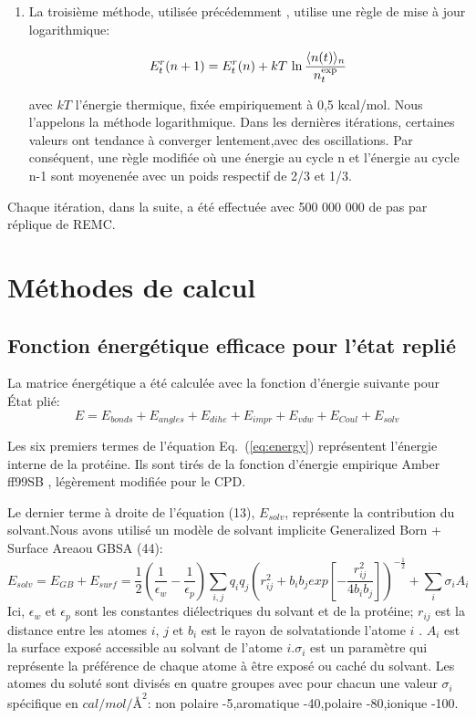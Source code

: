 \begin{enumerate}
\item La troisième méthode, utilisée précédemment \cite{Schmidt08,Simonson13b}, utilise une règle de mise à jour logarithmique:

  \begin{equation} \label{eq:log}
E^r_t (n+1) = E^r_t (n) + kT \, \ln \frac{\langle n(t) \rangle_n}{n_t^{\rm exp}}
\end{equation}

  avec $kT$ l'énergie thermique, fixée empiriquement à 0,5 kcal/mol. Nous l'appelons la méthode logarithmique. Dans les dernières itérations, certaines valeurs ont tendance à converger lentement,avec des oscillations. Par conséquent, une règle modifiée où une énergie au cycle n et l'énergie au cycle  n-1 sont moyenenée avec un poids respectif de 2/3 et 1/3.

\end{enumerate}
 
Chaque itération, dans la suite, a été effectuée avec 500 000 000 de pas par réplique de REMC.

\section{Méthodes de calcul}
  
\subsection{Fonction énergétique efficace pour l'état replié}

La matrice énergétique a été calculée avec la fonction d'énergie suivante pour
État plié:
\begin{equation}
  E = E_{bonds} + E_{angles} + E_{dihe} + E_{impr} + E_{vdw} + E_{Coul} + E_{solv}
  \label{eq:energy} 
\end{equation}

Les six premiers termes de l'équation Eq.\ (\ref{eq:energy})  représentent l'énergie interne de la protéine. Ils sont tirés de la fonction d'énergie empirique Amber ff99SB \cite{Cornell95}, légèrement modifiée pour le CPD.

Le dernier terme à droite de l'équation (13), $E_{solv}$, représente la contribution du solvant.Nous avons utilisé un modèle de solvant implicite \og Generalized Born + Surface Area\fg ou GBSA (44):
\begin{displaymath}
E_{solv} = E_{GB} + E_{surf} = \frac{1}{2}(\frac{1}{\epsilon_w} - \frac{1}{\epsilon_p})\sum_{i,j} q_iq_j (r^2_{ij} + b_ib_jexp[-\frac{r^2_{ij}}{4b_ib_j}])^{-\frac{1}{2}} + \sum_i \sigma_iA_i
\end{displaymath} 
Ici, $\epsilon_w$ et $\epsilon_p$ sont les constantes diélectriques du solvant et de la protéine; $r_{ij}$ est la distance entre les atomes $i$, $j$ et $b_i$ est le \og rayon de solvatation\fg de l'atome $i$ \cite{Hawkins95,Lopes07}. $A_i$ est la surface exposé accessible au solvant de l'atome $i$.$\sigma_i$ est un paramètre qui représente la préférence de chaque atome à être exposé ou caché du solvant. Les atomes du soluté sont divisés en quatre groupes avec pour chacun une valeur $\sigma_i$ spécifique en $cal/mol/Å^2$:
non polaire -5,aromatique -40,polaire -80,ionique -100.

